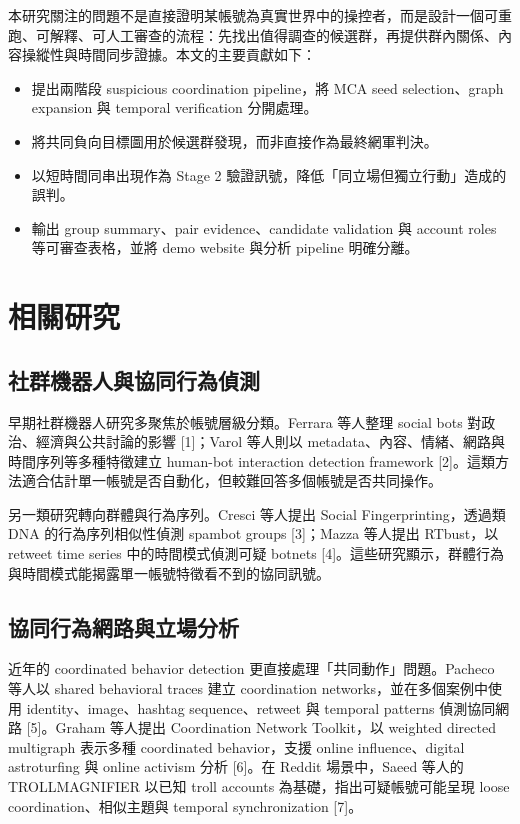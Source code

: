 \documentclass[conference]{IEEEtran}
\begin{document}
本研究關注的問題不是直接證明某帳號為真實世界中的操控者，而是設計一個可重跑、可解釋、可人工審查的流程：先找出值得調查的候選群，再提供群內關係、內容操縱性與時間同步證據。本文的主要貢獻如下：

\begin{itemize}
  \item 提出兩階段 suspicious coordination pipeline，將 MCA seed selection、graph expansion 與 temporal verification 分開處理。
  \item 將共同負向目標圖用於候選群發現，而非直接作為最終網軍判決。
  \item 以短時間同串出現作為 Stage 2 驗證訊號，降低「同立場但獨立行動」造成的誤判。
  \item 輸出 group summary、pair evidence、candidate validation 與 account roles 等可審查表格，並將 demo website 與分析 pipeline 明確分離。
\end{itemize}

\section{相關研究}

\subsection{社群機器人與協同行為偵測}

早期社群機器人研究多聚焦於帳號層級分類。Ferrara 等人整理 social bots 對政治、經濟與公共討論的影響 [1]；Varol 等人則以 metadata、內容、情緒、網路與時間序列等多種特徵建立 human-bot interaction detection framework [2]。這類方法適合估計單一帳號是否自動化，但較難回答多個帳號是否共同操作。

另一類研究轉向群體與行為序列。Cresci 等人提出 Social Fingerprinting，透過類 DNA 的行為序列相似性偵測 spambot groups [3]；Mazza 等人提出 RTbust，以 retweet time series 中的時間模式偵測可疑 botnets [4]。這些研究顯示，群體行為與時間模式能揭露單一帳號特徵看不到的協同訊號。

\subsection{協同行為網路與立場分析}

近年的 coordinated behavior detection 更直接處理「共同動作」問題。Pacheco 等人以 shared behavioral traces 建立 coordination networks，並在多個案例中使用 identity、image、hashtag sequence、retweet 與 temporal patterns 偵測協同網路 [5]。Graham 等人提出 Coordination Network Toolkit，以 weighted directed multigraph 表示多種 coordinated behavior，支援 online influence、digital astroturfing 與 online activism 分析 [6]。在 Reddit 場景中，Saeed 等人的 TROLLMAGNIFIER 以已知 troll accounts 為基礎，指出可疑帳號可能呈現 loose coordination、相似主題與 temporal synchronization [7]。
\end{document}
